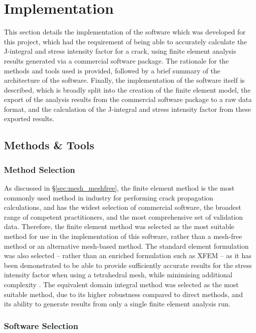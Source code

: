 \chapter{Implementation}\label{sec:implementation}

This section details the implementation of the software which was developed for this project, which had the requirement of being able to accurately calculate the J-integral and stress intensity factor for a crack, using finite element analysis results generated via a commercial software package. The rationale for the methods and tools used is provided, followed by a brief summary of the architecture of the software. Finally, the implementation of the software itself is described, which is broadly split into the creation of the finite element model, the export of the analysis results from the commercial software package to a raw data format, and the calculation of the J-integral and stress intensity factor from these exported results.

\newpage
\section{Methods \& Tools}

\subsection{Method Selection}

As discussed in \S\ref{sec:mesh_meshfree}, the finite element method is the most commonly used method in industry for performing crack propagation calculations, and has the widest selection of commercial software, the broadest range of competent practitioners, and the most comprehensive set of validation data. Therefore, the finite element method was selected as the most suitable method for use in the implementation of this software, rather than a mesh-free method or an alternative mesh-based method. The standard element formulation was also selected -- rather than an enriched formulation such as XFEM -- as it has been demonstrated to be able to provide sufficiently accurate results for the stress intensity factor when using a tetrahedral mesh, while minimising additional complexity \cite{nejati_use_2015}. The equivalent domain integral method was selected as the most suitable method, due to its higher robustness compared to direct methods, and its ability to generate results from only a single finite element analysis run.

\subsection{Software Selection}

